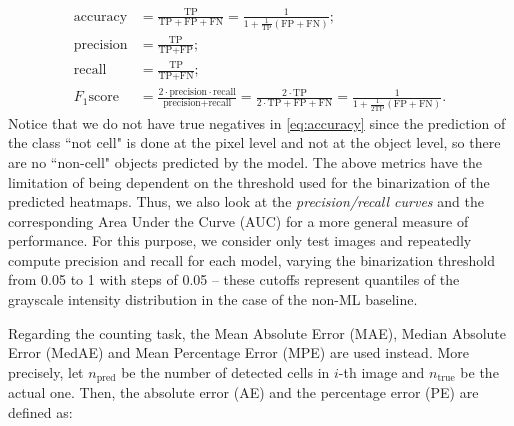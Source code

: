 \begin{align}
\text{accuracy} &=  \frac{\text{TP}}{\text{TP} + \text{FP} + \text{FN}}
= \frac{\text{1}}{\text{1} + \frac{1}{\text{TP}} \left(\text{FP} + \text{FN}\right)}
\label{eq:accuracy}; \\ 
\text{precision} &=    \frac{\text{TP}}{\text{TP} + \text{FP}}; \\
\text{recall} &=    \frac{\text{TP}}{\text{TP} + \text{FN}}; \\ 
F_1 \text{score} &=  \frac{2 \cdot \text{precision} \cdot \text{recall}}{\text{precision} + \text{recall}}
= \frac{2 \cdot \text{TP}}{2 \cdot \text{TP} + \text{FP} + \text{FN}} 
= \frac{\text{1}}{\text{1} + \frac{1}{\text{2TP}} \left(\text{FP} + \text{FN}\right)}
\label{eq:F1}.
\end{align}
Notice that we do not have true negatives in \cref{eq:accuracy} since the prediction of the class ``not cell" is done at the pixel level and not at the object level, so there are no ``non-cell" objects predicted by the model.
The above metrics have the limitation of being dependent on the threshold used for the binarization of the predicted heatmaps. Thus, we also look at the \textit{precision/recall curves} and the corresponding Area Under the Curve (AUC) \cite{hanley1982meaning, mason2002areas} for a more general measure of performance. For this purpose, we consider only test images and repeatedly compute precision and recall for each model, varying the binarization threshold from 0.05 to 1 with steps of 0.05 -- these cutoffs represent quantiles of the grayscale intensity distribution in the case of the non-ML baseline.


Regarding the counting task, the Mean Absolute Error (MAE), Median Absolute Error (MedAE) and Mean Percentage Error (MPE) are used instead. More precisely, let $n_{\text{pred}}$ be the number of detected cells in $i$-th image  and $n_{\text{true}}$ be the actual one. Then, the absolute error (AE) and the percentage error (PE) are defined as:


